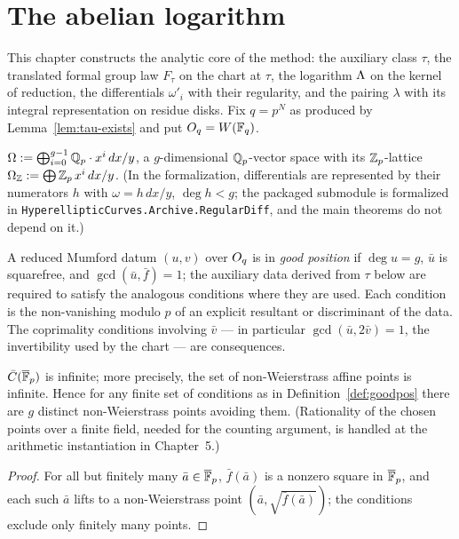 \chapter{The abelian logarithm}
This chapter constructs the analytic core of the method: the auxiliary class $\tau$, the
translated formal group law $F_\tau$ on the chart at $\tau$, the logarithm $\Lambda$ on the
kernel of reduction, the differentials $\omega'_i$ with their regularity, and the pairing
$\lambda$ with its integral representation on residue disks. Fix $q = p^N$ as produced by
Lemma~\ref{lem:tau-exists} and put $O_q = W(\mathbb{F}_q)$.

\begin{definition}
\label{def:regdiff}
\leanok
$\Omega := \bigoplus_{i=0}^{g-1} \mathbb{Q}_p\cdot x^i\,dx/y$, a $g$-dimensional $\mathbb{Q}_p$-vector
space with its $\mathbb{Z}_p$-lattice $\Omega_{\mathbb{Z}} := \bigoplus \mathbb{Z}_p\, x^i\,dx/y$. (In the
formalization, differentials are represented by their numerators $h$ with
$\omega = h\,dx/y$, $\deg h < g$; the packaged submodule is formalized in
\texttt{HyperellipticCurves.Archive.RegularDiff}, and the main theorems do not depend on it.)
\end{definition}

\begin{definition}
\label{def:goodpos}
\leanok
{}
A reduced Mumford datum $(u, v)$ over $O_q$ is in \emph{good position} if $\deg u = g$,
$\bar u$ is squarefree, and $\gcd(\bar u, \bar f) = 1$; the auxiliary data derived from
$\tau$ below are required to satisfy the analogous conditions where they are used. Each
condition is the non-vanishing modulo $p$ of an explicit resultant or discriminant of the
data. The coprimality conditions involving $\bar v$ --- in particular
$\gcd(\bar u, 2\bar v) = 1$, the invertibility used by the chart --- are consequences.
\end{definition}

\begin{lemma}
\label{lem:many-points}
\leanok
$\bar C(\overline{\mathbb{F}}_p)$ is infinite; more precisely, the set of non-Weierstrass affine points is
infinite. Hence for any finite set of conditions as in Definition~\ref{def:goodpos} there
are $g$ distinct non-Weierstrass points avoiding them. (Rationality of the chosen points
over a finite field, needed for the counting argument, is handled at the arithmetic
instantiation in Chapter~5.)
\end{lemma}
\begin{proof}
\leanok
For all but finitely many $\bar a \in \overline{\mathbb{F}}_p$, $\bar f(\bar a)$ is a nonzero square in
$\overline{\mathbb{F}}_p$, and each such $\bar a$ lifts to a non-Weierstrass point
$(\bar a, \sqrt{\bar f(\bar a)})$; the conditions exclude only finitely many points.
\end{proof}

